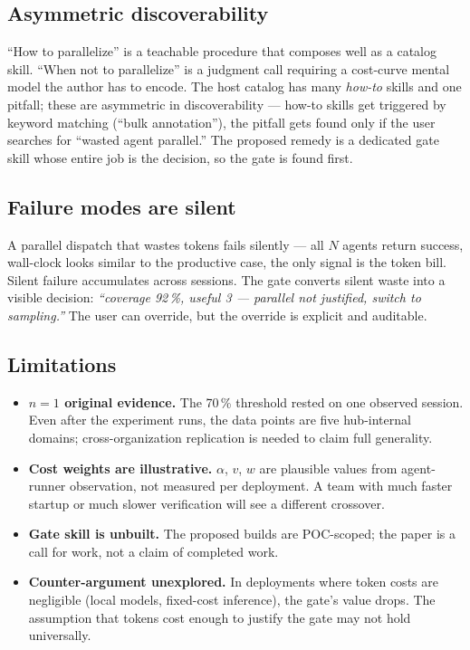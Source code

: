 \documentclass[10pt,letterpaper]{article}
\begin{document}
\subsection{Asymmetric discoverability}

``How to parallelize'' is a teachable procedure that composes well as a
catalog skill. ``When not to parallelize'' is a judgment call requiring
a cost-curve mental model the author has to encode. The host catalog has
many \emph{how-to} skills and one pitfall; these are asymmetric in
discoverability --- how-to skills get triggered by keyword matching
(``bulk annotation''), the pitfall gets found only if the user searches
for ``wasted agent parallel.'' The proposed remedy is a dedicated gate
skill whose entire job is the decision, so the gate is found first.

\subsection{Failure modes are silent}

A parallel dispatch that wastes tokens fails silently --- all $N$ agents
return success, wall-clock looks similar to the productive case, the only
signal is the token bill. Silent failure accumulates across sessions. The
gate converts silent waste into a visible decision: \emph{``coverage
92\,\%, useful 3 --- parallel not justified, switch to sampling.''} The
user can override, but the override is explicit and auditable.

\subsection{Limitations}

\begin{itemize}
\item \textbf{$n=1$ original evidence.} The 70\,\% threshold rested on one
  observed session. Even after the experiment runs, the data points are
  five hub-internal domains; cross-organization replication is needed
  to claim full generality.
\item \textbf{Cost weights are illustrative.} $\alpha$, $v$, $w$ are
  plausible values from agent-runner observation, not measured per
  deployment. A team with much faster startup or much slower
  verification will see a different crossover.
\item \textbf{Gate skill is unbuilt.} The proposed builds are
  POC-scoped; the paper is a call for work, not a claim of completed
  work.
\item \textbf{Counter-argument unexplored.} In deployments where token
  costs are negligible (local models, fixed-cost inference), the gate's
  value drops. The assumption that tokens cost enough to justify the
  gate may not hold universally.
\end{itemize}
\end{document}
